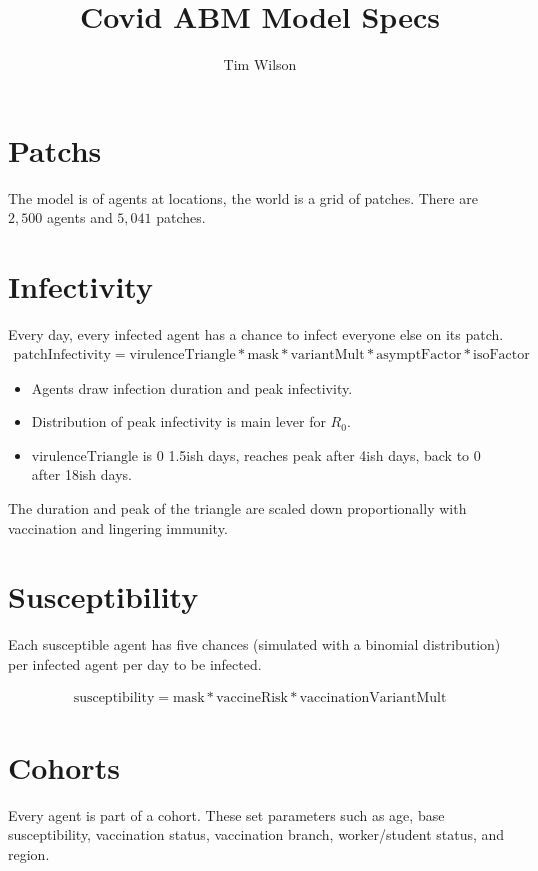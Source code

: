 \documentclass[]{article}
\title{Covid ABM Model Specs}
\author{Tim Wilson}
\begin{document}
	

\section{Patchs}
The model is of agents at locations, the world is a grid of patches. There are $2,500$ agents and $5,041$ patches.

\section{Infectivity}
Every day, every infected agent has a chance to infect everyone else on its patch.
\begin{align*}
	\text{patchInfectivity} = \text{virulenceTriangle} * \text{mask} * \text{variantMult} * \text{asymptFactor} * \text{isoFactor}
\end{align*}
\begin{itemize}
\item Agents draw infection duration and peak infectivity.
\item Distribution of peak infectivity is main lever for $R_0$.
\item $\text{virulenceTriangle}$ is $0$ 1.5ish days, reaches peak after 4ish days, back to $0$ after 18ish days.
\end{itemize}

The duration and peak of the triangle are scaled down proportionally with vaccination and lingering immunity.

\section{Susceptibility}
Each susceptible agent has five chances (simulated with a binomial distribution) per infected agent per day to be infected.

\begin{align*}
	\text{susceptibility} = \text{mask} * \text{vaccineRisk} * \text{vaccinationVariantMult}
\end{align*}

\section{Cohorts}
Every agent is part of a cohort. These set parameters such as age, base susceptibility, vaccination status, vaccination branch, worker/student status, and region.
\end{document}

